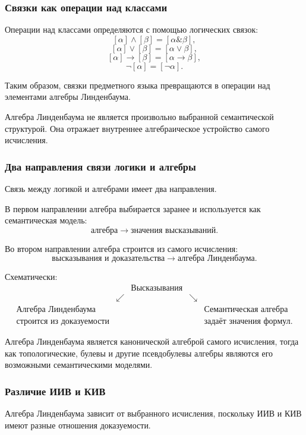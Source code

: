 \documentclass[12pt,a4paper,oneside,openany]{book}
\theoremstyle{definition}
\theoremstyle{plain}
\theoremstyle{remark}
\begin{document}
\subsubsection{Связки как операции над классами}

Операции над классами определяются с помощью логических связок:
\[
[\alpha]\wedge[\beta]
=
[\alpha\mathbin{\&}\beta],
\]
\[
[\alpha]\vee[\beta]
=
[\alpha\lor\beta],
\]
\[
[\alpha]\to[\beta]
=
[\alpha\to\beta],
\]
\[
\neg[\alpha]
=
[\neg\alpha].
\]

Таким образом, связки предметного языка превращаются в операции над
элементами алгебры Линденбаума.

Алгебра Линденбаума не является произвольно выбранной семантической
структурой. Она отражает внутреннее алгебраическое устройство самого
исчисления.

\subsubsection{Два направления связи логики и алгебры}

Связь между логикой и алгебрами имеет два направления.

В первом направлении алгебра выбирается заранее и используется как
семантическая модель:
\[
\text{алгебра}
\longrightarrow
\text{значения высказываний}.
\]

Во втором направлении алгебра строится из самого исчисления:
\[
\text{высказывания и доказательства}
\longrightarrow
\text{алгебра Линденбаума}.
\]

Схематически:
\[
\boxed{
\begin{array}{ccccc}
&&
\text{Высказывания}
&&
\\
&
\swarrow
&&
\searrow
&
\\
\text{Алгебра Линденбаума}
&&
&&
\text{Семантическая алгебра}
\\
\text{строится из доказуемости}
&&
&&
\text{задаёт значения формул}.
\end{array}
}
\]

Алгебра Линденбаума является канонической алгеброй самого исчисления,
тогда как топологические, булевы и другие псевдобулевы алгебры
являются его возможными семантическими моделями.

\subsubsection{Различие ИИВ и КИВ}

Алгебра Линденбаума зависит от выбранного исчисления, поскольку ИИВ и
КИВ имеют разные отношения доказуемости.
\end{document}

